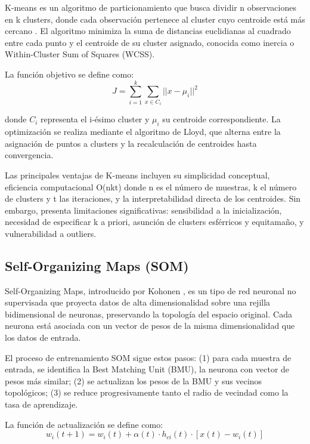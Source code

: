 \documentclass[12pt,a4paper]{article}
\begin{document}
K-means es un algoritmo de particionamiento que busca dividir n observaciones en k clusters, donde cada observación pertenece al cluster cuyo centroide está más cercano \cite{macqueen1967}. El algoritmo minimiza la suma de distancias euclidianas al cuadrado entre cada punto y el centroide de su cluster asignado, conocida como inercia o Within-Cluster Sum of Squares (WCSS).

La función objetivo se define como:
\begin{equation}
J = \sum_{i=1}^{k} \sum_{x \in C_i} ||x - \mu_i||^2
\end{equation}

donde $C_i$ representa el i-ésimo cluster y $\mu_i$ su centroide correspondiente. La optimización se realiza mediante el algoritmo de Lloyd, que alterna entre la asignación de puntos a clusters y la recalculación de centroides hasta convergencia.

Las principales ventajas de K-means incluyen su simplicidad conceptual, eficiencia computacional O(nkt) donde n es el número de muestras, k el número de clusters y t las iteraciones, y la interpretabilidad directa de los centroides. Sin embargo, presenta limitaciones significativas: sensibilidad a la inicialización, necesidad de especificar k a priori, asunción de clusters esférricos y equitamaño, y vulnerabilidad a outliers.

\subsection{Self-Organizing Maps (SOM)}

Self-Organizing Maps, introducido por Kohonen \cite{kohonen1982}, es un tipo de red neuronal no supervisada que proyecta datos de alta dimensionalidad sobre una rejilla bidimensional de neuronas, preservando la topología del espacio original. Cada neurona está asociada con un vector de pesos de la misma dimensionalidad que los datos de entrada.

El proceso de entrenamiento SOM sigue estos pasos: (1) para cada muestra de entrada, se identifica la Best Matching Unit (BMU), la neurona con vector de pesos más similar; (2) se actualizan los pesos de la BMU y sus vecinos topológicos; (3) se reduce progresivamente tanto el radio de vecindad como la tasa de aprendizaje.

La función de actualización se define como:
\begin{equation}
w_i(t+1) = w_i(t) + \alpha(t) \cdot h_{ci}(t) \cdot [x(t) - w_i(t)]
\end{equation}
\end{document}
